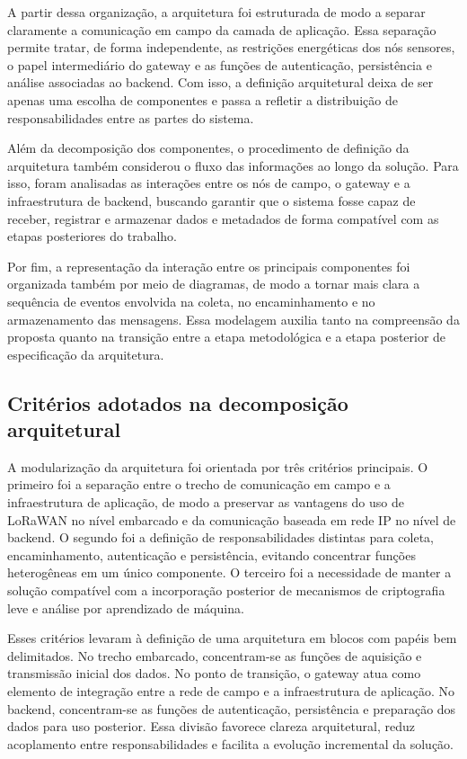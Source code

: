 A partir dessa organização, a arquitetura foi estruturada de modo a separar claramente a comunicação em campo da camada de aplicação. Essa separação permite tratar, de forma independente, as restrições energéticas dos nós sensores, o papel intermediário do gateway e as funções de autenticação, persistência e análise associadas ao backend. Com isso, a definição arquitetural deixa de ser apenas uma escolha de componentes e passa a refletir a distribuição de responsabilidades entre as partes do sistema.

Além da decomposição dos componentes, o procedimento de definição da arquitetura também considerou o fluxo das informações ao longo da solução. Para isso, foram analisadas as interações entre os nós de campo, o gateway e a infraestrutura de backend, buscando garantir que o sistema fosse capaz de receber, registrar e armazenar dados e metadados de forma compatível com as etapas posteriores do trabalho.

Por fim, a representação da interação entre os principais componentes foi organizada também por meio de diagramas, de modo a tornar mais clara a sequência de eventos envolvida na coleta, no encaminhamento e no armazenamento das mensagens. Essa modelagem auxilia tanto na compreensão da proposta quanto na transição entre a etapa metodológica e a etapa posterior de especificação da arquitetura.

\subsection{Critérios adotados na decomposição arquitetural}

A modularização da arquitetura foi orientada por três critérios principais. O primeiro foi a separação entre o trecho de comunicação em campo e a infraestrutura de aplicação, de modo a preservar as vantagens do uso de LoRaWAN no nível embarcado e da comunicação baseada em rede IP no nível de backend. O segundo foi a definição de responsabilidades distintas para coleta, encaminhamento, autenticação e persistência, evitando concentrar funções heterogêneas em um único componente. O terceiro foi a necessidade de manter a solução compatível com a incorporação posterior de mecanismos de criptografia leve e análise por aprendizado de máquina.

Esses critérios levaram à definição de uma arquitetura em blocos com papéis bem delimitados. No trecho embarcado, concentram-se as funções de aquisição e transmissão inicial dos dados. No ponto de transição, o gateway atua como elemento de integração entre a rede de campo e a infraestrutura de aplicação. No backend, concentram-se as funções de autenticação, persistência e preparação dos dados para uso posterior. Essa divisão favorece clareza arquitetural, reduz acoplamento entre responsabilidades e facilita a evolução incremental da solução.

